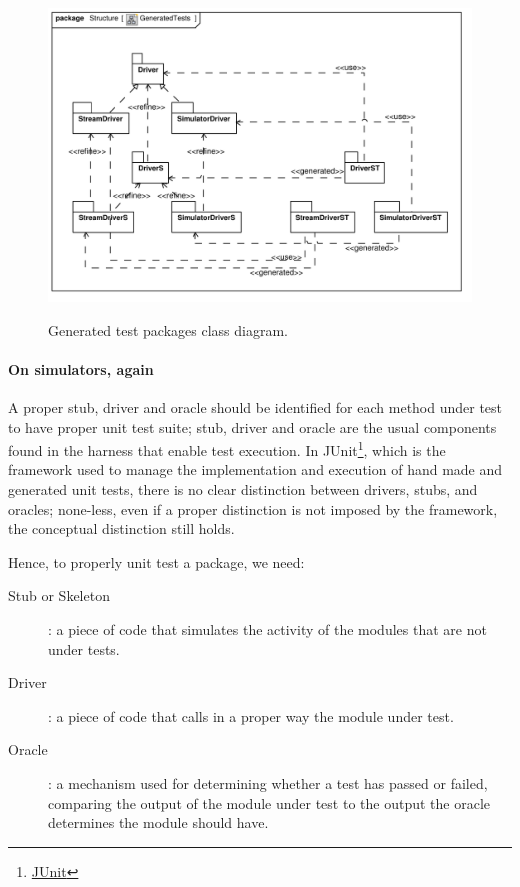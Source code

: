 \documentclass{article} \usepackage{times}
\newcommand{\myhref}[2]{\ifpdf\href{#1}{#2}\else\htmladdnormallinkfoot{#2}{#1}\fi}
\begin{document}
\begin{figure}[htb!]
  \centering
  \includegraphics[scale=0.7]{UML_model/Class_Diagram__Structure__GeneratedTests}
  \label{fig:class_diagram_generatedtest}
  \caption{Generated test packages class diagram.}
\end{figure}

\paragraph*{On simulators, again}

A proper stub, driver and oracle should be identified for each method
under test to have proper unit test suite; stub, driver and oracle are
the usual components found in the harness that enable test
execution\cite{Binder1999}.  In
JUnit\footnote{\myhref{http://www.junit.org/}{JUnit}}, which is the
framework used to manage the implementation and execution of hand made
and generated unit tests, there is no clear distinction between
drivers, stubs, and oracles; none-less, even if a proper distinction
is not imposed by the framework, the conceptual distinction still
holds.

Hence, to properly unit test a package, we need:

\begin{description}
\item[Stub or Skeleton]: a piece of code that simulates the activity
  of the modules that are not under tests.
\item[Driver]: a piece of code that calls in a proper way the module
  under test.
\item[Oracle]: a mechanism used for determining whether a test has
  passed or failed, comparing the output of the module under test to
  the output the oracle determines the module should have.
\end{description}
\end{document}
